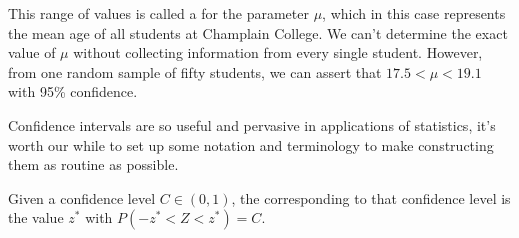 This range of values is called a  for the parameter $\mu$, which in this case represents the mean age of all students at Champlain College. We can't determine the exact value of $\mu$ without collecting information from every single student. However, from one random sample of fifty students, we can assert that $17.5 < \mu < 19.1$ with 95\% confidence.

Confidence intervals are so useful and pervasive in applications of statistics, it's worth our while to set up some notation and terminology to make constructing them as routine as possible.

\begin{definition}Given a confidence level $C \in (0,1)$, the  corresponding to that confidence level is the value $z^*$ with $P(-z^* < Z < z^*) = C$.
\end{definition}
\begin{center}
\end{center}

